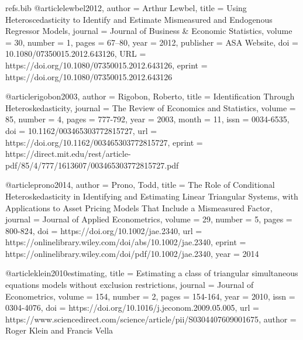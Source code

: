 \begin{filecontents}[force]{refs.bib}
@article{lewbel2012,
author = {Arthur Lewbel},
title = {Using Heteroscedasticity to Identify and Estimate Mismeasured and Endogenous Regressor Models},
journal = {Journal of Business \& Economic Statistics},
volume = {30},
number = {1},
pages = {67--80},
year = {2012},
publisher = {ASA Website},
doi = {10.1080/07350015.2012.643126},
URL = {https://doi.org/10.1080/07350015.2012.643126},
eprint = {https://doi.org/10.1080/07350015.2012.643126}
}

@article{rigobon2003,
    author = {Rigobon, Roberto},
    title = {Identification Through Heteroskedasticity},
    journal = {The Review of Economics and Statistics},
    volume = {85},
    number = {4},
    pages = {777-792},
    year = {2003},
    month = {11},
    issn = {0034-6535},
    doi = {10.1162/003465303772815727},
    url = {https://doi.org/10.1162/003465303772815727},
    eprint = {https://direct.mit.edu/rest/article-pdf/85/4/777/1613607/003465303772815727.pdf}
}

@article{prono2014,
author = {Prono, Todd},
title = {The Role of Conditional Heteroskedasticity in Identifying and Estimating Linear Triangular Systems, with Applications to Asset Pricing Models That Include a Mismeasured Factor},
journal = {Journal of Applied Econometrics},
volume = {29},
number = {5},
pages = {800-824},
doi = {https://doi.org/10.1002/jae.2340},
url = {https://onlinelibrary.wiley.com/doi/abs/10.1002/jae.2340},
eprint = {https://onlinelibrary.wiley.com/doi/pdf/10.1002/jae.2340},
year = {2014}
}

@article{klein2010estimating,
title = {Estimating a class of triangular simultaneous equations models without exclusion restrictions},
journal = {Journal of Econometrics},
volume = {154},
number = {2},
pages = {154-164},
year = {2010},
issn = {0304-4076},
doi = {https://doi.org/10.1016/j.jeconom.2009.05.005},
url = {https://www.sciencedirect.com/science/article/pii/S0304407609001675},
author = {Roger Klein and Francis Vella}
}

\end{filecontents}

\documentclass{article}
\usepackage[utf8]{inputenc}
\usepackage{mathtools}
\usepackage{amsmath}
\usepackage{amsthm}
\usepackage{amssymb}
\usepackage{geometry}
\geometry{verbose}
\usepackage[backend=biber, style=authoryear, citestyle=authoryear]{biblatex}


\usepackage{enumitem}
\usepackage{hyperref}


